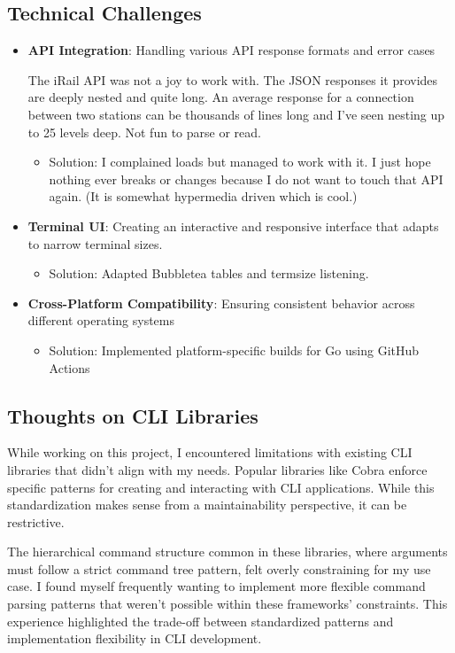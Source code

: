 \documentclass[10pt,a4paper]{article}
\begin{document}
\subsection{Technical Challenges}
\begin{itemize}
	\item \textbf{API Integration}: Handling various API response formats and error cases

	      The iRail API was not a joy to work with. The JSON responses it provides are deeply nested and quite long. An average response for a connection between two stations can be thousands of lines long and I've seen nesting up to 25 levels deep. Not
	      fun to parse or read.
	      \begin{itemize}
		      \item Solution: I complained loads but managed to work with it. I just hope nothing ever breaks or changes because I do not want to touch that API again. (It is somewhat hypermedia driven which is cool.)
	      \end{itemize}
	\item \textbf{Terminal UI}: Creating an interactive and responsive interface that adapts to narrow terminal sizes.
	      \begin{itemize}
		      \item Solution: Adapted Bubbletea tables and termsize listening.
	      \end{itemize}
	\item \textbf{Cross-Platform Compatibility}: Ensuring consistent behavior across different operating systems
	      \begin{itemize}
		      \item Solution: Implemented platform-specific builds for Go using GitHub Actions
	      \end{itemize}
\end{itemize}


\subsection{Thoughts on CLI Libraries}

While working on this project, I encountered limitations with existing CLI libraries that didn't align with my needs. Popular libraries like Cobra enforce specific patterns for creating and interacting with CLI applications. While this standardization makes sense from a maintainability perspective, it can be restrictive.

The hierarchical command structure common in these libraries, where arguments must follow a strict command tree pattern, felt overly constraining for my use case. I found myself frequently wanting to implement more flexible command parsing patterns that weren't possible within these frameworks' constraints. This experience highlighted the trade-off between standardized patterns and implementation flexibility in CLI development.
\end{document}
